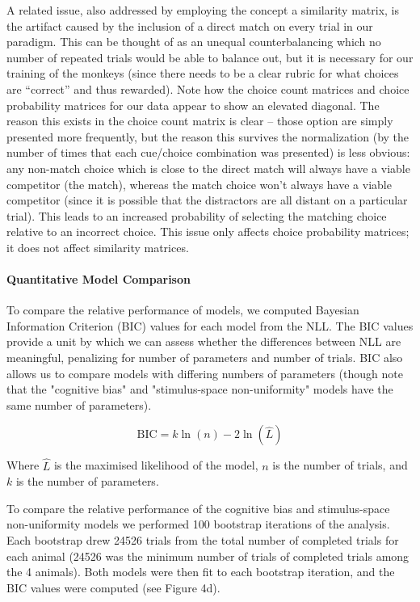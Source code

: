 A related issue, also addressed by employing the concept a similarity matrix, is the artifact caused by the inclusion of a direct match on every trial in our paradigm. 
This can be thought of as an unequal counterbalancing which no number of repeated trials would be able to balance out, but it is necessary for our training of the monkeys (since there needs to be a clear rubric for what choices are “correct” and thus rewarded).
Note how the choice count matrices and choice probability matrices for our data appear to show an elevated diagonal. 
The reason this exists in the choice count matrix is clear – those option are simply presented more frequently, but the reason this survives the normalization (by the number of times that each cue/choice combination was presented) is less obvious: any non-match choice which is close to the direct match will always have a viable competitor (the match), whereas the match choice won't always have a viable competitor (since it is possible that the distractors are all distant on a particular trial).
This leads to an increased probability of selecting the matching choice relative to an incorrect choice. This issue only affects choice probability matrices; it does not affect similarity matrices.

\paragraph{Quantitative Model Comparison}
To compare the relative performance of models, we computed Bayesian Information Criterion (BIC) values for each model from the NLL. 
The BIC values provide a unit by which we can assess whether the differences between NLL are meaningful, penalizing for number of parameters and number of trials. 
BIC also allows us to compare models with differing numbers of parameters (though note that the "cognitive bias" and "stimulus-space non-uniformity" models have the same number of parameters).

\begin{equation}
    \text{BIC} = k\ln(n)-2\ln(\hat{L})
\end{equation}

Where $\hat{L}$ is the maximised likelihood of the model, $n$ is the number of trials, and $k$ is the number of parameters.

To compare the relative performance of the cognitive bias and stimulus-space non-uniformity models we performed 100 bootstrap iterations of the analysis. 
Each bootstrap drew 24526 trials from the total number of completed trials for each animal (24526 was the minimum number of trials of completed trials among the 4 animals). 
Both models were then fit to each bootstrap iteration, and the BIC values were computed (see Figure 4d).

